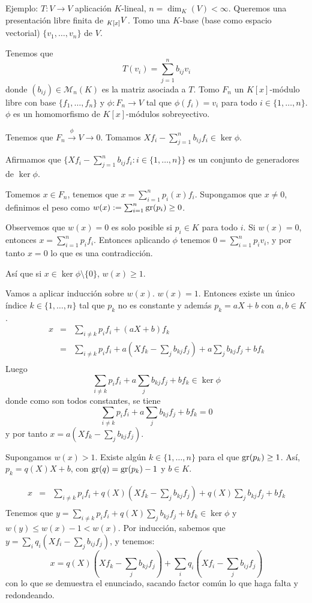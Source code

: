 Ejemplo: \(T:V\longrightarrow V\) aplicación \(K\)-lineal,
\(n=\dim_K(V)<\infty\). Queremos una presentación
libre finita de \(\prescript{}{K[x]}{V}\). Tomo una
\(K\)-base (base como espacio vectorial)
\(\{v_1,\ldots, v_n\}\) de \(V\).

Tenemos que
\[
  T(v_i)=\sum_{j=1}^n b_{ij} v_i
\]
donde \((b_{ij})\in\mathcal{M}_n(K)\) es la matriz asociada a \(T\). Tomo
\(F_n\) un \(K[x]\)-módulo libre con base \(\{f_1,\ldots, f_n\}\)
y \(\phi: F_n\longrightarrow V\) tal que \(\phi(f_i)=v_i\)
para todo \(i\in\{1,\ldots,n\}\). \(\phi\) es un homomorfismo de
\(K[x]\)-módulos sobreyectivo.

Tenemos que \(F_n\overset{\phi}{\longrightarrow} V\longrightarrow 0\).
Tomamos \(Xf_i-\sum_{j=1}^n b_{ij}f_i\in\ker\phi\).

Afirmamos que \(\{Xf_i-\sum_{j=1}^n b_{ij}f_i:i\in\{1,\ldots,n\}\}\)
es un conjunto de generadores de \(\ker\phi\).

Tomemos \(x\in F_n\), tenemos que \(x=\sum_{i=1}^n p_i(x)f_i\). Supongamos
que \(x\neq 0\), definimos el peso como \(w(x):=\sum_{i=1}^n \operatorname{gr}(p_i)\ge 0\).

Observemos que \(w(x)=0\) es solo posible si \(p_i\in K\) para todo \(i\).
Si \(w(x)=0\), entonces \(x=\sum_{i=1}^n p_i f_i\).
Entonces aplicando \(\phi\) tenemos
\(0=\sum_{i=1}^n p_i v_i\), y por tanto \(x=0\) lo que es una contradicción.

Así que si \(x\in\ker\phi\setminus\{0\}\), \(w(x)\ge 1\).

Vamos a aplicar inducción sobre \(w(x)\). \(w(x)=1\). Entonces existe un
único índice \(k\in\{1,\ldots,n\}\) tal que \(p_k\) no es constante
y además \(p_k=aX+b\) con \(a,b\in K\).
\begin{eqnarray*}
  x&=&\sum_{i\neq k} p_i f_i + (aX+b)f_k\\
  &=&\sum_{i\neq k} p_i f_i + a(Xf_k-\sum_j b_{kj}f_j)+a\sum_j b_{kj}f_j
  +bf_k\\
\end{eqnarray*}
Luego
\[
  \sum_{i\neq k}p_i f_i+a\sum_j b_{kj}f_j+bf_k\in\ker\phi
\]
donde como son todos constantes, se tiene
\[
  \sum_{i\neq k}p_i f_i+a\sum_j b_{kj}f_j+bf_k=0
\]
y por tanto \(x=a(Xf_k-\sum_j b_{kj}f_j)\).

Supongamos \(w(x)>1\). Existe algún \(k\in\{1,\ldots,n\}\) para el que
\(\operatorname{gr}(p_k)\ge 1\). Así, \(p_k=q(X)X+b\), con \(\operatorname{gr}(q)=\operatorname{gr}(p_k)-1\) y
\(b\in K\).

\begin{eqnarray*}
  x&=&\sum_{i\neq k} p_i f_i +q(X)(Xf_k-\sum_j b_{kj}f_j)
  +q(X)\sum_j b_{kj}f_j+bf_k\\
\end{eqnarray*}
Tenemos que \(y=\sum_{i\neq k} p_i f_i+q(X)\sum_j b_{kj}f_j+bf_k\in\ker\phi\)
y \(w(y)\le w(x)-1<w(x)\). Por inducción, sabemos que \(y=\sum_i q_i (Xf_i
-\sum_j b_{ij}f_j)\),
y tenemos:
\[
  x= q(X)(Xf_k-\sum_j b_{kj}f_j)+\sum_i q_i (Xf_i
-\sum_j b_{ij}f_j)
\]
con lo que se demuestra el enunciado, sacando factor común lo que haga
falta y redondeando.

